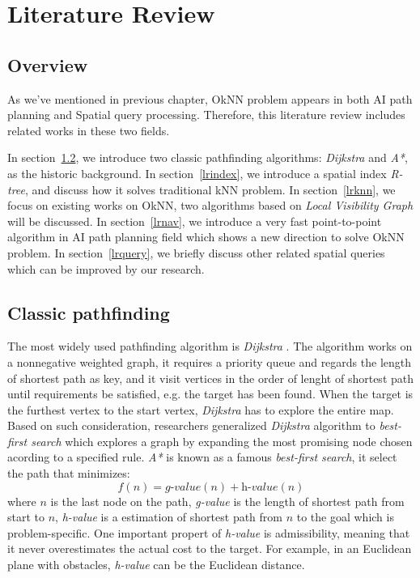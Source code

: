 \chapter{Literature Review}\label{lreview}
\section{Overview}\label{lroverview}
As we've mentioned in previous chapter, OkNN problem appears in both
AI path planning and Spatial query processing. Therefore, this literature review includes
related works in these two fields.

In section~\ref{lrai}, we introduce two classic pathfinding algorithms:
\textit{Dijkstra} and \textit{A*}, as the historic background.
In section~\ref{lrindex}, we introduce a spatial index \textit{R-tree},
and discuss how it solves traditional kNN problem.
In section~\ref{lrknn}, we focus on existing works on OkNN, two algorithms based on
\textit{Local Visibility Graph} will be discussed. 
In section~\ref{lrnav}, we introduce a very fast point-to-point algorithm in AI path planning
field which shows a new direction to solve OkNN problem.
In section~\ref{lrquery}, we briefly discuss other related spatial queries which can be
improved by our research.

\section{Classic pathfinding}\label{lrai}
The most widely used pathfinding algorithm is \textit{Dijkstra} \cite{dijkstra1959note}. 
The algorithm works on a nonnegative weighted graph, it requires a priority queue and
regards the length of shortest path as key, and it visit vertices in the order
of lenght of shortest path until requirements be satisfied, e.g. the target has been found.
When the target is the furthest vertex to the start vertex, \textit{Dijkstra} has to explore the entire
map. Based on such consideration, researchers generalized \textit{Dijkstra} algorithm to
\textit{best-first search} which explores a graph by expanding the most promising node chosen
acording to a specified rule.
\textit{A*} \cite{hart1968formal} is known as a famous \textit{best-first search},
it select the path that minimizes:
$$
f(n) = \textit{g-value}(n) + \textit{h-value}(n)
$$
where $n$ is the last node on the path, \textit{g-value} is the length of shortest path from start to
$n$, \textit{h-value} is a estimation of shortest path from $n$ to the goal which is
problem-specific. One important propert of \textit{h-value} is admissibility, meaning that it never
overestimates the actual cost to the target.
For example, in an Euclidean plane with obstacles, \textit{h-value} can be the Euclidean
distance.

